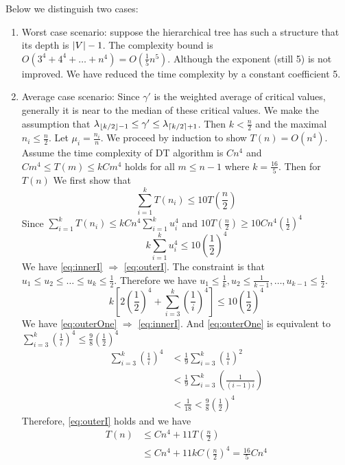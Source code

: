 \documentclass{article}
\begin{document}
Below we distinguish two cases:
\begin{enumerate}
\item Worst case scenario: suppose the hierarchical tree has such a structure that its depth is $\lvert V\rvert - 1$.  The complexity bound is $O(3^4+4^4 + \dots + n^4) = O(\frac{1}{5} n^5)$. Although the exponent (still 5) is not improved. We have reduced the time complexity by a constant coefficient 5.
\item Average case scenario: Since $\gamma'$ is the weighted average of critical values, generally it is near to the median of these critical values. We make the assumption that $ \lambda_{\lfloor k/2\rfloor - 1} \leq \gamma' \leq \lambda_{\lceil k/2\rceil + 1}$. Then $k < \frac{n}{2}$ and the maximal $n_i \leq \frac{n}{2}$. Let $\mu_i = \frac{n_i}{n}$. We proceed by induction to show $T(n) = O(n^4)$. Assume the time complexity of DT algorithm is $C n^4$
and $Cm^4 \leq T(m) \leq kC m^4$ holds for all $m \leq n-1$ where $k=\frac{16}{5}$. Then for $T(n)$
We first show that 
\begin{equation}\label{eq:outerI}
\sum_{i=1}^k T(n_i) \leq 10 T(\frac{n}{2})
\end{equation}
Since $\sum_{i=1}^k T(n_i) \leq kC n^4\sum_{i=1}^k u_i^4$ and $10 T(\frac{n}{2}) \geq 10Cn^4 (\frac{1}{2})^4$
\begin{equation}\label{eq:innerI}
k\sum_{i=1}^k u_i^4 \leq 10 (\frac{1}{2})^4 
\end{equation}
We have \eqref{eq:innerI} $\Rightarrow$ \eqref{eq:outerI}. The constraint is that $u_1\leq u_2 \leq \dots \leq u_k \leq \frac{1}{2}$. Therefore we have $u_1 \leq \frac{1}{k}, u_2 \leq \frac{1}{k-1}, \dots, u_{k-1} \leq \frac{1}{2}$.
\begin{equation}\label{eq:outerOne}
k[2(\frac{1}{2})^4 + \sum_{i=3}^k (\frac{1}{i})^4] \leq 10 (\frac{1}{2})^4
\end{equation}
We have \eqref{eq:outerOne} $\Rightarrow$ \eqref{eq:innerI}. And \eqref{eq:outerOne} is equivalent to
$\sum_{i=3}^k (\frac{1}{i})^4 \leq \frac{9}{8}(\frac{1}{2})^4$
\begin{align*}
	\sum_{i=3}^k (\frac{1}{i})^4 & < \frac{1}{9}\sum_{i=3}^k (\frac{1}{i})^2 \\
              & < \frac{1}{9}\sum_{i=3}^k (\frac{1}{(i-1)i}) \\
              & < \frac{1}{18} < \frac{9}{8}(\frac{1}{2})^4
\end{align*}
Therefore, \eqref{eq:outerI} holds and we have 
\begin{align}
T(n)  & \leq Cn^4 + 11T(\frac{n}{2}) \\
& \leq C n^4 + 11 k C (\frac{n}{2})^4 = \frac{16}{5} C n^4
\end{align}
\end{enumerate}
\end{document}
